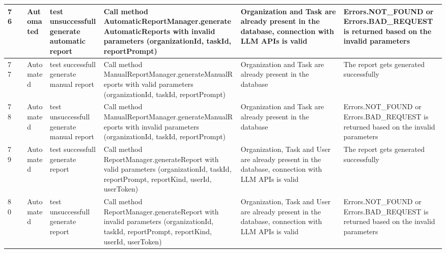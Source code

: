 \documentclass{article}
\begin{document}
{\begin{tabular}{|
    >{\columncolor[HTML]{FFFFFF}}l |
    >{\columncolor[HTML]{FFFFFF}}c |
    >{\columncolor[HTML]{FFFFFF}}l |l|l|l|l|}
    76          & \cellcolor[HTML]{FFFFFF}                                      & {\color[HTML]{11734B} Automated} & test unsuccessfull generate automatic report            & Call method AutomaticReportManager.generateAutomaticReports with invalid parameters (organizationId, taskId, reportPrompt)                                & Organization and Task are already present in the database, connection with LLM APIs is valid       & Errors.NOT\_FOUND or Errors.BAD\_REQUEST is returned based on the invalid parameters \\ \cline{1-1} \cline{3-7} 
    77          & \cellcolor[HTML]{FFFFFF}                                      & {\color[HTML]{11734B} Automated} & test successfull generate manual report                 & Call method ManualReportManager.generateManualReports with valid parameters (organizationId, taskId, reportPrompt)                                        & Organization and Task are already present in the database                                          & \cellcolor[HTML]{FFFFFF}The report gets generated successfully                       \\ \cline{1-1} \cline{3-7} 
    78          & \cellcolor[HTML]{FFFFFF}                                      & {\color[HTML]{11734B} Automated} & test unsuccessfull generate manual report               & Call method ManualReportManager.generateManualReports with invalid parameters (organizationId, taskId, reportPrompt)                                      & Organization and Task are already present in the database                                          & Errors.NOT\_FOUND or Errors.BAD\_REQUEST is returned based on the invalid parameters \\ \cline{1-1} \cline{3-7} 
    79          & \cellcolor[HTML]{FFFFFF}                                      & {\color[HTML]{11734B} Automated} & test successfull generate report                        & Call method ReportManager.generateReport with valid parameters (organizationId, taskId, reportPrompt, reportKind, userId, userToken)                      & Organization, Task and User are already present in the database, connection with LLM APIs is valid & The report gets generated successfully                                               \\ \cline{1-1} \cline{3-7} 
    80          & \multirow{-14}{*}{\cellcolor[HTML]{FFFFFF}Test ReportManager} & {\color[HTML]{11734B} Automated} & test unsuccessfull generate report                      & Call method ReportManager.generateReport with invalid parameters (organizationId, taskId, reportPrompt, reportKind, userId, userToken)                    & Organization, Task and User are already present in the database, connection with LLM APIs is valid & Errors.NOT\_FOUND or Errors.BAD\_REQUEST is returned based on the invalid parameters \\ \hline
    \end{tabular}
}
\end{document}

